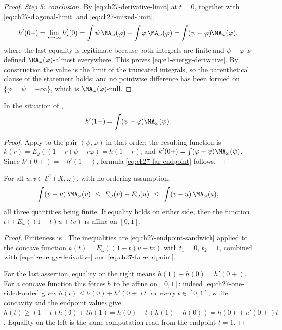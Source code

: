 \begin{proof}
\emph{Step 5: conclusion.}
By \eqref{eq:ch27-derivative-limit} at \(t=0\), together with
\eqref{eq:ch27-diagonal-limit} and \eqref{eq:ch27-mixed-limit},
\[
 h'(0+)=\lim_{s\to\infty}h_s'(0)
 =\int\psi\,\MA_\omega(\varphi)-\int\varphi\,\MA_\omega(\varphi)
 =\int(\psi-\varphi)\MA_\omega(\varphi),
\]
where the last equality is legitimate because both integrals are finite and
\(\psi-\varphi\) is defined \(\MA_\omega(\varphi)\)-almost everywhere.  This
proves \eqref{eq:e1-energy-derivative}.  By construction the value is the
limit of the truncated integrals, so the parenthetical clause of the
statement holds; and no pointwise difference has been formed on
\(\{\varphi=\psi=-\infty\}\), which is \(\MA_\omega(\varphi)\)-null.
\end{proof}

\begin{corollary}
\label{cor:ch27-far-endpoint}
In the situation of ,
\begin{equation}\label{eq:ch27-far-endpoint}
 h'(1-)=\int(\psi-\varphi)\MA_\omega(\psi).
\end{equation}
\end{corollary}

\begin{proof}
Apply  to the pair \((\psi,\varphi)\)
in that order: the resulting function is \(k(r)=E_\omega((1-r)\psi+r\varphi)
=h(1-r)\), and \(k'(0+)=\int(\varphi-\psi)\MA_\omega(\psi)\).  Since
\(k'(0+)=-h'(1-)\), formula \eqref{eq:ch27-far-endpoint} follows.
\end{proof}

\begin{corollary}
\label{cor:ch27-two-sided-sandwich}
For all \(u,v\in\mathcal E^1(X,\omega)\), with no ordering assumption,
\begin{equation}\label{eq:ch27-two-sided-sandwich}
 \int(v-u)\,\MA_\omega(v)
 \ \leq\ E_\omega(v)-E_\omega(u)
 \ \leq\ \int(v-u)\,\MA_\omega(u),
\end{equation}
all three quantities being finite.  If equality holds on either side, then
the function \(t\mapsto E_\omega((1-t)u+tv)\) is affine on \([0,1]\).
\end{corollary}

\begin{proof}
Finiteness is .  The inequalities are
\eqref{eq:ch27-endpoint-sandwich} applied to the concave function
\(h(t)=E_\omega((1-t)u+tv)\) with \(t_1=0\), \(t_2=1\), combined with
\eqref{eq:e1-energy-derivative} and \eqref{eq:ch27-far-endpoint}.

For the last assertion, equality on the right means
\(h(1)-h(0)=h'(0+)\).  For a concave function this forces \(h\) to be
affine on \([0,1]\): indeed \eqref{eq:ch27-one-sided-order} gives
\(h(t)\leq h(0)+h'(0+)t\) for every \(t\in[0,1]\), while concavity and the
endpoint values give
\(h(t)\geq(1-t)h(0)+th(1)=h(0)+t\,(h(1)-h(0))=h(0)+h'(0+)t\).  Equality on
the left is the same computation read from the endpoint \(t=1\).
\end{proof}

